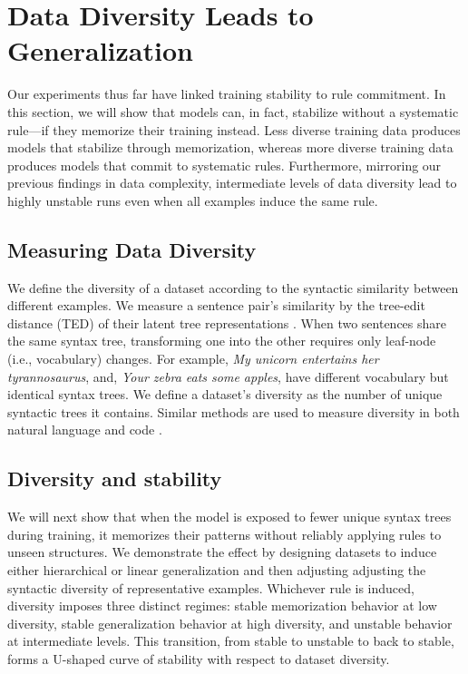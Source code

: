 \section{Data Diversity Leads to Generalization}
\label{sec:data_diversity}
Our experiments thus far have linked training stability to rule commitment. In this section, we will show that models can, in fact, stabilize without a systematic rule---if they memorize their training instead. Less diverse training data produces models that stabilize through memorization, whereas more diverse training data produces models that commit to systematic rules. Furthermore, mirroring our previous findings in data complexity, intermediate levels of data diversity lead to highly unstable runs even when all examples induce the same rule. 
\subsection{Measuring Data Diversity}
\label{sec:data_diveristy}

We define the diversity of a dataset according to the syntactic similarity between different examples. 
We measure a sentence pair's similarity by the tree-edit distance (TED) of their latent tree representations \citep{Chomsky2015-bg}. When two sentences share the same syntax tree, transforming one into the other requires only leaf-node (i.e., vocabulary) changes. For example, \textit{My unicorn entertains her tyrannosaurus}, and, \textit{Your zebra eats some apples}, have different vocabulary but identical syntax trees. We define a dataset's diversity as the number of unique syntactic trees it contains. Similar methods are used to measure diversity in both natural language \citep{Huang2023-ab, Gao2024-fi, Ramirez2022-mx} and code \citep{Song2024-cg}. 

\subsection{Diversity and stability}
\label{sec:inverse}

We will next show that when the model is exposed to fewer unique syntax trees during training, it memorizes their patterns without reliably applying rules to unseen structures. We demonstrate the effect by designing datasets to induce either hierarchical or linear generalization and then adjusting adjusting the syntactic diversity of representative examples. Whichever rule is induced, diversity imposes three distinct regimes: stable memorization behavior at low diversity, stable generalization behavior at high diversity, and unstable behavior at intermediate levels. This transition, from stable to unstable to back to stable, forms a U-shaped curve of stability with respect to dataset diversity.

